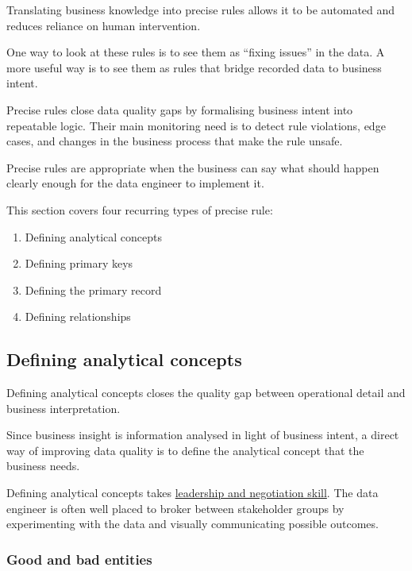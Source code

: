 \documentclass[10pt,openany,10pt]{book}
\providecommand{\tightlist}{%
  \setlength{\itemsep}{0pt}\setlength{\parskip}{0pt}}
\begin{document}
Translating business knowledge into precise rules allows it to be
automated and reduces reliance on human intervention.

One way to look at these rules is to see them as ``fixing issues'' in
the data. A more useful way is to see them as rules that bridge recorded
data to business intent.

Precise rules close data quality gaps by formalising business intent
into repeatable logic. Their main monitoring need is to detect rule
violations, edge cases, and changes in the business process that make
the rule unsafe.

Precise rules are appropriate when the business can say what should
happen clearly enough for the data engineer to implement it.

This section covers four recurring types of precise rule:

\begin{enumerate}
\def\labelenumi{\arabic{enumi}.}
\tightlist
\item
  Defining analytical concepts
\item
  Defining primary keys
\item
  Defining the primary record
\item
  Defining relationships
\end{enumerate}

\subsection{Defining analytical
concepts}\label{defining-analytical-concepts}

Defining analytical concepts closes the quality gap between operational
detail and business interpretation.

Since business insight is information analysed in light of business
intent, a direct way of improving data quality is to define the
analytical concept that the business needs.

Defining analytical concepts takes
\hyperref[docs-foundations-data-and-organisations]{leadership and
negotiation skill}. The data engineer is often well placed to broker
between stakeholder groups by experimenting with the data and visually
communicating possible outcomes.

\subsubsection{Good and bad entities}\label{good-and-bad-entities-1}
\end{document}
